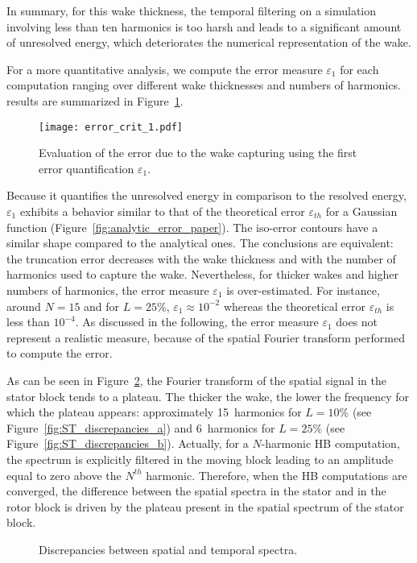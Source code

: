 In summary, for this wake thickness, the temporal filtering 
on a simulation involving less than ten harmonics is too harsh and leads 
to a significant amount of unresolved energy, 
which deteriorates the numerical representation
of the wake.

For a more quantitative analysis, we compute the error measure
$\varepsilon_1$ for each computation ranging over different 
wake thicknesses and numbers of harmonics. 
 results are summarized in Figure~\ref{fig:crit_1_3d}.
\begin{figure}[htp]
    \centering\texttt{[image: error\_crit\_1.pdf]}
  \caption{Evaluation of the error due to the wake 
  capturing using the first error quantification $\varepsilon_1$.}
  \label{fig:crit_1_3d}
\end{figure}
Because it quantifies the unresolved energy in 
comparison to the resolved energy, $\varepsilon_1$ 
exhibits a behavior similar to that of 
the theoretical error $\varepsilon_{th}$ for a Gaussian function 
(Figure~\ref{fig:analytic_error_paper}).
The iso-error contours have a similar shape 
compared to the analytical ones. 
The conclusions are equivalent: the truncation error decreases with 
the wake thickness and with the number of harmonics used to capture the wake.
Nevertheless, for thicker wakes and higher numbers of harmonics, 
the error measure $\varepsilon_1$ is over-estimated. 
For instance, around $N=15$ and for $L=25\%$,
$\varepsilon_1 \approx 10^{-2}$ whereas the theoretical error $\varepsilon_{th}$
is less than $10^{-4}$. As discussed in the following, the error 
measure $\varepsilon_1$ does not represent a 
realistic measure, because of the spatial 
Fourier transform performed to compute 
the error.

As can be seen in Figure~\ref{fig:ST_discrepancies}, 
the Fourier transform of the spatial signal in the stator block tends to a plateau. 
The thicker the wake, 
the lower the frequency for which the plateau appears: 
approximately 15~harmonics for $L=10\%$
(see Figure~\ref{fig:ST_discrepancies_a}) and 
6~harmonics for $L=25\%$ (see Figure~\ref{fig:ST_discrepancies_b}).
Actually, for a $N$-harmonic HB computation, the spectrum is 
explicitly filtered in the moving block leading to an amplitude 
equal to zero above the $N^{th}$ harmonic. 
Therefore, when the HB computations are converged, the difference between the spatial 
spectra in the stator and in the rotor block is driven by the plateau present 
in the spatial spectrum of the stator block.
\begin{figure}[htp]
  \begin{center}
  \end{center}
  \caption{Discrepancies between spatial and temporal spectra.}
  \label{fig:ST_discrepancies}
\end{figure}

